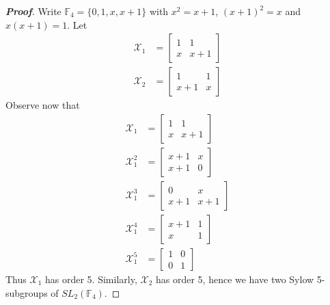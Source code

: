 \documentclass[12pt,leqno]{book}
\theoremstyle{definition}
\newcommand{\F}{\mathbb{F}}
\newenvironment{Proof}{\begin{proof}[\textnormal{\textbf{Proof}}]}{\end{proof}}
\begin{document}
\begin{enumerate}
\begin{Proof}
Write $\F_4=\{0,1,x,x+1\}$ with $x^2=x+1$, $(x+1)^2=x$ and $x(x+1)=1$. Let \begin{align*}\mathcal{X}_1&=\begin{bmatrix}1&1\\x&x+1\end{bmatrix}\\\mathcal{X}_2&=\begin{bmatrix}1&1\\x+1&x\end{bmatrix}\end{align*} Observe now that \begin{align*}\mathcal{X}_1&=\begin{bmatrix}1&1\\x&x+1\end{bmatrix}\\\mathcal{X}_1^2&=\begin{bmatrix}x+1&x\\x+1&0\end{bmatrix}\\\mathcal{X}_1^3&=\begin{bmatrix}0&x\\x+1&x+1\end{bmatrix}\\\mathcal{X}_1^4&=\begin{bmatrix}x+1&1\\x&1\end{bmatrix}\\\mathcal{X}_1^5&=\begin{bmatrix}1&0\\0&1\end{bmatrix}\end{align*} Thus $\mathcal{X}_1$ has order 5. Similarly, $\mathcal{X}_2$ has order 5, hence we have two Sylow 5-subgroups of $SL_2(\F_4)$. 
\end{Proof}

\end{enumerate}
\end{document}
